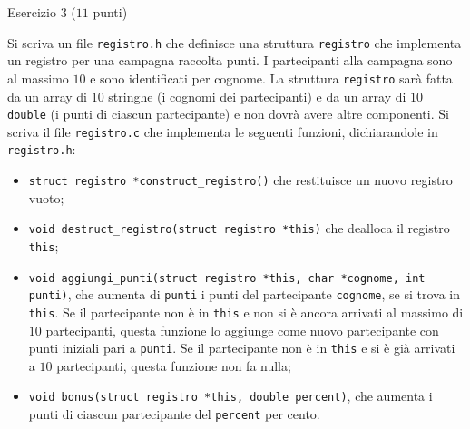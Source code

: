 \documentclass[12pt]{article}
\begin{document}
\begin{center}{\Large Esercizio 3} ($11$ punti)\end{center}
%
Si scriva un file \texttt{registro.h} che definisce una struttura
\texttt{registro} che implementa un registro per una campagna raccolta punti.
I partecipanti alla campagna sono al massimo $10$ e sono identificati per cognome.
La struttura \texttt{registro} sar\`a fatta da un array di $10$ stringhe (i cognomi dei
partecipanti) e da un array di $10$ \texttt{double} (i punti di ciascun partecipante) e non
dovr\`a avere altre componenti.
Si scriva il file \texttt{registro.c} che implementa le seguenti funzioni, dichiarandole
in \texttt{registro.h}:
%
\begin{itemize}
\item \texttt{struct registro *construct\_registro()} che restituisce un nuovo registro vuoto;
\item \texttt{void destruct\_registro(struct registro *this)} che dealloca il registro \texttt{this};
\item \texttt{void aggiungi\_punti(struct registro *this, char *cognome, int punti)},
      che aumenta di \texttt{punti} i punti del partecipante \texttt{cognome}, se si
      trova in \texttt{this}. Se il partecipante non \`e
      in \texttt{this} e non si \`e ancora arrivati al massimo di $10$ partecipanti, questa funzione
      lo aggiunge come nuovo partecipante con punti
      iniziali pari a \texttt{punti}.  Se il partecipante non \`e
      in \texttt{this} e si \`e gi\`a arrivati a $10$ partecipanti, questa funzione non
      fa nulla;
\item \texttt{void bonus(struct registro *this, double percent)}, che aumenta i
      punti di ciascun partecipante del \texttt{percent} per cento.
\end{itemize}
%

%
%
%
%
\end{document}
